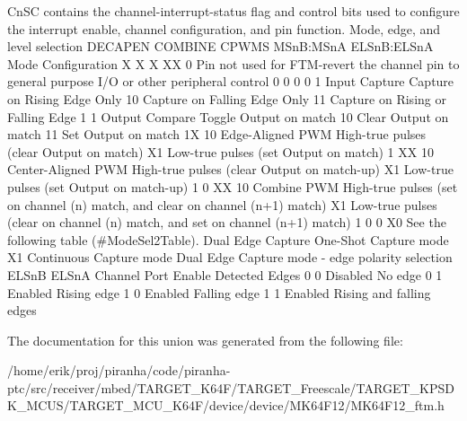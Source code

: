 Cn\+SC contains the channel-\/interrupt-\/status flag and control bits used to configure the interrupt enable, channel configuration, and pin function. Mode, edge, and level selection D\+E\+C\+A\+P\+EN C\+O\+M\+B\+I\+NE C\+P\+W\+MS M\+SnB\+:M\+SnA E\+L\+SnB\+:E\+L\+SnA Mode Configuration X X X XX 0 Pin not used for F\+T\+M-\/revert the channel pin to general purpose I/O or other peripheral control 0 0 0 0 1 Input Capture Capture on Rising Edge Only 10 Capture on Falling Edge Only 11 Capture on Rising or Falling Edge 1 1 Output Compare Toggle Output on match 10 Clear Output on match 11 Set Output on match 1X 10 Edge-\/\+Aligned P\+WM High-\/true pulses (clear Output on match) X1 Low-\/true pulses (set Output on match) 1 XX 10 Center-\/\+Aligned P\+WM High-\/true pulses (clear Output on match-\/up) X1 Low-\/true pulses (set Output on match-\/up) 1 0 XX 10 Combine P\+WM High-\/true pulses (set on channel (n) match, and clear on channel (n+1) match) X1 Low-\/true pulses (clear on channel (n) match, and set on channel (n+1) match) 1 0 0 X0 See the following table (\#\+Mode\+Sel2\+Table). Dual Edge Capture One-\/\+Shot Capture mode X1 Continuous Capture mode Dual Edge Capture mode -\/ edge polarity selection E\+L\+SnB E\+L\+SnA Channel Port Enable Detected Edges 0 0 Disabled No edge 0 1 Enabled Rising edge 1 0 Enabled Falling edge 1 1 Enabled Rising and falling edges 

The documentation for this union was generated from the following file\+:\begin{DoxyCompactItemize}
\item 
/home/erik/proj/piranha/code/piranha-\/ptc/src/receiver/mbed/\+T\+A\+R\+G\+E\+T\+\_\+\+K64\+F/\+T\+A\+R\+G\+E\+T\+\_\+\+Freescale/\+T\+A\+R\+G\+E\+T\+\_\+\+K\+P\+S\+D\+K\+\_\+\+M\+C\+U\+S/\+T\+A\+R\+G\+E\+T\+\_\+\+M\+C\+U\+\_\+\+K64\+F/device/device/\+M\+K64\+F12/M\+K64\+F12\+\_\+ftm.\+h\end{DoxyCompactItemize}
